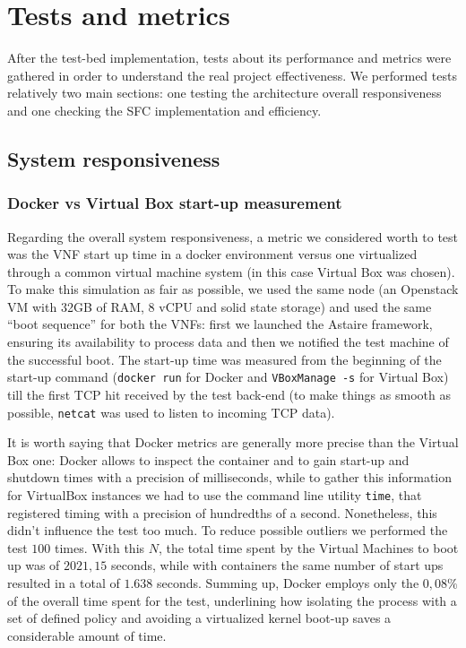 \chapter{Tests and metrics}

After the test-bed implementation, tests about its performance and metrics were
gathered in order to understand the real project effectiveness. We performed
tests relatively two main sections: one testing the architecture overall
responsiveness and one checking the SFC implementation and efficiency.

\section{System responsiveness}

\subsection{Docker vs Virtual Box start-up measurement}

Regarding the overall system responsiveness, a metric we considered worth to 
test was the VNF start up time in a docker environment versus one virtualized 
through a common virtual machine system (in this case Virtual Box was chosen). 
To make this simulation as fair as possible, we used the same node (an 
Openstack VM with 32GB of RAM, 8 vCPU and solid state storage) and used the 
same ``boot sequence'' for both the VNFs: first we launched the Astaire 
framework, ensuring its availability to process data and then we notified the 
test machine of the successful boot. The start-up time was measured from the 
beginning of the start-up command (\verb!docker run! for Docker and 
\verb!VBoxManage -s! for Virtual Box) till the first TCP hit received by the 
test back-end (to make things as smooth as possible, \verb!netcat! was used 
to listen to incoming TCP data).

It is worth saying that Docker metrics are generally more precise than the
Virtual Box one: Docker allows to inspect the container and to gain start-up and
shutdown times with a precision of milliseconds, while to gather this 
information for VirtualBox instances we had to use the command line utility 
\verb!time!, that registered timing with a precision of hundredths of a second. 
Nonetheless, this didn't influence the test too much. To reduce possible 
outliers we performed the test $100$ times. With this $N$, the total time spent 
by the Virtual Machines to boot up was of $2021,15$ seconds, while with 
containers the same number of start ups resulted in a total of $1.638$ seconds. 
Summing up, Docker employs only the $0,08\%$ of the overall time spent for the 
test, underlining how isolating the process with a set of defined policy and 
avoiding a virtualized kernel boot-up saves a considerable amount of time.

